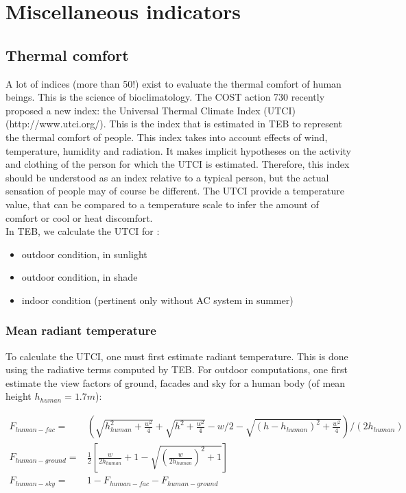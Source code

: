 
\clearpage
\section{Miscellaneous indicators}
\subsection{Thermal comfort}

A lot of indices (more than 50!) exist to evaluate the thermal comfort of human beings. This is the science of bioclimatology. The COST action 730 recently proposed a new index: the Universal Thermal Climate Index (UTCI) (http://www.utci.org/). This is the index that is estimated in TEB to represent the thermal comfort of people. This index takes into account effects of wind, temperature, humidity and radiation. It makes implicit hypotheses on the activity and clothing of the person for which the UTCI is estimated. Therefore, this index should be understood as an index relative to a typical person, but the actual sensation of people may of course be different. The UTCI provide a temperature value, that can be compared to a temperature scale to infer the amount of comfort or cool or heat discomfort. \\

In TEB, we calculate the UTCI for :
\begin{itemize}
\item outdoor condition, in sunlight
\item outdoor condition, in shade
\item indoor condition (pertinent only without AC system in summer)
\end{itemize}

\subsubsection{Mean radiant temperature}

To calculate the UTCI, one must first estimate radiant temperature. This is done using the radiative terms computed by TEB.  For outdoor computations, one first estimate the view factors of ground, facades and sky for a human body (of mean height $h_{human}=1.7m$):

\begin{eqnarray}
	F_{human-fac} = & \left(\sqrt{h_{human}^2 + \frac{w^2}{4}}
	+ \sqrt{h^2 + \frac{w^2}{4}} -w/2 
	- \sqrt{(h-h_{human})^2 + \frac{w^2}{4}}\right) / (2h_{human}) \nonumber \\
	F_{human-ground} = & \frac{1}{2}\left[ \frac{w}{2h_{human}} + 1 -\sqrt{\left(\frac{w}{2h_{human}}\right)^2+1} \right] \nonumber \\
	F_{human-sky} = & 1 - F_{human-fac} - F_{human-ground} \nonumber 
\end{eqnarray}
	

